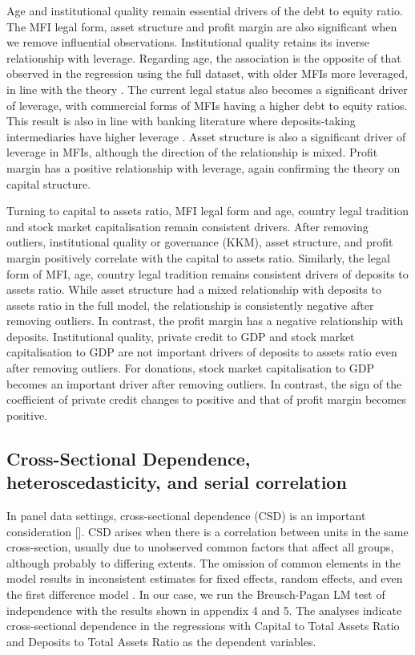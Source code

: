 \documentclass[a4paper,nobind]{templates/ociamthesis}
\begin{document}
Age and institutional quality remain essential drivers of the debt to equity ratio. The MFI legal form, asset structure and profit margin are also significant when we remove influential observations. Institutional quality retains its inverse relationship with leverage. Regarding age, the association is the opposite of that observed in the regression using the full dataset, with older MFIs more leveraged, in line with the theory \autocite{barclay2005capital}. The current legal status also becomes a significant driver of leverage, with commercial forms of MFIs having a higher debt to equity ratios. This result is also in line with banking literature where deposits-taking intermediaries have higher leverage \autocite{gale2020bank}. Asset structure is also a significant driver of leverage in MFIs, although the direction of the relationship is mixed. Profit margin has a positive relationship with leverage, again confirming the theory on capital structure.

Turning to capital to assets ratio, MFI legal form and age, country legal tradition and stock market capitalisation remain consistent drivers. After removing outliers, institutional quality or governance (KKM), asset structure, and profit margin positively correlate with the capital to assets ratio. Similarly, the legal form of MFI, age, country legal tradition remains consistent drivers of deposits to assets ratio. While asset structure had a mixed relationship with deposits to assets ratio in the full model, the relationship is consistently negative after removing outliers. In contrast, the profit margin has a negative relationship with deposits. Institutional quality, private credit to GDP and stock market capitalisation to GDP are not important drivers of deposits to assets ratio even after removing outliers. For donations, stock market capitalisation to GDP becomes an important driver after removing outliers. In contrast, the sign of the coefficient of private credit changes to positive and that of profit margin becomes positive.

\hypertarget{cross-sectional-dependence-heteroscedasticity-and-serial-correlation}{%
\subsection{Cross-Sectional Dependence, heteroscedasticity, and serial correlation}\label{cross-sectional-dependence-heteroscedasticity-and-serial-correlation}}

In panel data settings, cross-sectional dependence (CSD) is an important consideration {[}{]}. CSD arises when there is a correlation between units in the same cross-section, usually due to unobserved common factors that affect all groups, although probably to differing extents. The omission of common elements in the model results in inconsistent estimates for fixed effects, random effects, and even the first difference model \autocite{henningsen2019analysis}. In our case, we run the Breusch-Pagan LM test of independence with the results shown in appendix 4 and 5. The analyses indicate cross-sectional dependence in the regressions with Capital to Total Assets Ratio and Deposits to Total Assets Ratio as the dependent variables.
\end{document}
